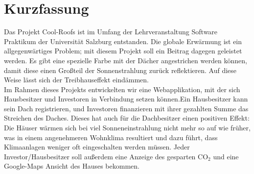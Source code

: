 \documentclass[12pt,a4paper]{article}
\begin{document}
\setcounter{page}{1}
\tableofcontents 
\clearpage


\section{Kurzfassung}
Das Projekt Cool-Roofs ist im Umfang der Lehrveranstaltung Software Praktikum der Universität Salzburg entstanden. Die globale Erwärmung ist ein allgegenwärtiges Problem; mit diesem Projekt soll ein Beitrag dagegen geleistet werden. Es gibt eine spezielle Farbe mit der Dächer angestrichen werden können, damit diese einen Großteil der Sonnenstrahlung zurück reflektieren. Auf diese Weise lässt sich der Treibhauseffekt eindämmen.\\
Im Rahmen dieses Projekts entwickelten wir eine Webapplikation, mit der sich Hausbesitzer und Investoren in Verbindung setzen können.Ein Hausbesitzer kann sein Dach registrieren, und Investoren finanzieren mit ihrer gezahlten Summe das Streichen des Daches. Dieses hat auch für die Dachbesitzer einen positiven Effekt: Die Häuser wärmen sich bei viel Sonneneinstrahlung nicht mehr so auf wie früher, was in einem angenehmeren Wohnklima resultiert und dazu führt, dass Klimaanlagen weniger oft eingeschalten werden müssen. Jeder Investor/Hausbesitzer soll außerdem eine Anzeige des gesparten CO$_2$ und eine Google-Maps Ansicht des Hauses bekommen.
\end{document}
